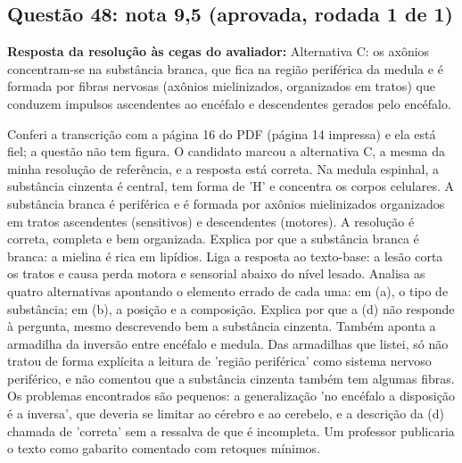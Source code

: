 \documentclass{article}%
\begin{document}
\subsection*{Questão 48: nota 9,5 (aprovada, rodada 1 de 1)}%
\textbf{Resposta da resolução às cegas do avaliador:} Alternativa C: os axônios concentram{-}se na substância branca, que fica na região periférica da medula e é formada por fibras nervosas (axônios mielinizados, organizados em tratos) que conduzem impulsos ascendentes ao encéfalo e descendentes gerados pelo encéfalo.\par %
Conferi a transcrição com a página 16 do PDF (página 14 impressa) e ela está fiel; a questão não tem figura. O candidato marcou a alternativa C, a mesma da minha resolução de referência, e a resposta está correta. Na medula espinhal, a substância cinzenta é central, tem forma de 'H' e concentra os corpos celulares. A substância branca é periférica e é formada por axônios mielinizados organizados em tratos ascendentes (sensitivos) e descendentes (motores). A resolução é correta, completa e bem organizada. Explica por que a substância branca é branca: a mielina é rica em lipídios. Liga a resposta ao texto{-}base: a lesão corta os tratos e causa perda motora e sensorial abaixo do nível lesado. Analisa as quatro alternativas apontando o elemento errado de cada uma: em (a), o tipo de substância; em (b), a posição e a composição. Explica por que a (d) não responde à pergunta, mesmo descrevendo bem a substância cinzenta. Também aponta a armadilha da inversão entre encéfalo e medula. Das armadilhas que listei, só não tratou de forma explícita a leitura de 'região periférica' como sistema nervoso periférico, e não comentou que a substância cinzenta também tem algumas fibras. Os problemas encontrados são pequenos: a generalização 'no encéfalo a disposição é a inversa', que deveria se limitar ao cérebro e ao cerebelo, e a descrição da (d) chamada de 'correta' sem a ressalva de que é incompleta. Um professor publicaria o texto como gabarito comentado com retoques mínimos.%
\end{document}
